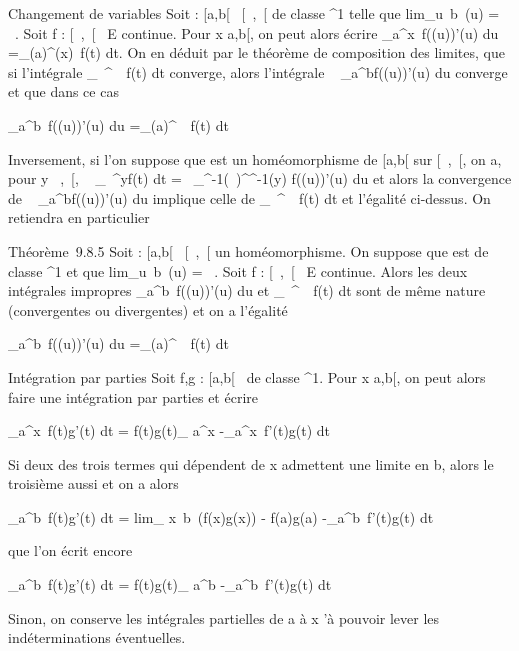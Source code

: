 \documentclass[]{article}
\begin{document}
Changement de variables Soit \phi : {[}a,b{[}\rightarrow~ {[}\alpha~,\beta~{[} de classe
^1 telle que lim\_u\rightarrow~b~\phi(u)
= \beta~. Soit f : {[}\alpha~,\beta~{[}\rightarrow~ E continue. Pour x \in {[}a,b{[}, on peut alors
écrire \int  \_a^x~f(\phi(u))\phi'(u) du
=\int  \_\phi(a)^\phi(x)~f(t) dt. On en
déduit par le théorème de composition des limites, que si l'intégrale
\int  \_\alpha~^\beta~~f(t) dt converge, alors
l'intégrale \int ~
\_a^bf(\phi(u))\phi'(u) du converge et que dans ce cas

\int  \_a^b~f(\phi(u))\phi'(u) du
=\int  \_\phi(a)^\beta~~f(t) dt

Inversement, si l'on suppose que \phi est un homéomorphisme de {[}a,b{[}
sur {[}\alpha~,\beta~{[}, on a, pour y \in {[}\alpha~,\beta~{[}, \int ~
\_\alpha~^yf(t) dt =\int ~
\_\phi^-1(\alpha~)^\phi^-1(y) f(\phi(u))\phi'(u) du et
alors la convergence de \int ~
\_a^bf(\phi(u))\phi'(u) du implique celle de
\int  \_\alpha~^\beta~~f(t) dt et l'égalité
ci-dessus. On retiendra en particulier

Théorème~9.8.5 Soit \phi : {[}a,b{[}\rightarrow~ {[}\alpha~,\beta~{[} un homéomorphisme. On
suppose que \phi est de classe ^1 et que
lim\_u\rightarrow~b~\phi(u) = \beta~. Soit f : {[}\alpha~,\beta~{[}\rightarrow~
E continue. Alors les deux intégrales impropres
\int  \_a^b~f(\phi(u))\phi'(u) du et
\int  \_\alpha~^\beta~~f(t) dt sont de même
nature (convergentes ou divergentes) et on a l'égalité

\int  \_a^b~f(\phi(u))\phi'(u) du
=\int  \_\phi(a)^\beta~~f(t) dt

Intégration par parties Soit f,g : {[}a,b{[}\rightarrow~  de classe
^1. Pour x \in {[}a,b{[}, on peut alors faire une intégration
par parties et écrire

\int  \_a^x~f(t)g'(t) dt =
\left {[}f(t)g(t)\right {]}\_
a^x -\int  \_a^x~f'(t)g(t)
dt

Si deux des trois termes qui dépendent de x admettent une limite en b,
alors le troisième aussi et on a alors

\int  \_a^b~f(t)g'(t) dt
= lim\_ x\rightarrow~b~(f(x)g(x)) - f(a)g(a)
-\int  \_a^b~f'(t)g(t) dt

que l'on écrit encore

\int  \_a^b~f(t)g'(t) dt =
\left {[}f(t)g(t)\right {]}\_
a^b -\int  \_a^b~f'(t)g(t)
dt

Sinon, on conserve les intégrales partielles de a à x \jmathusqu'à pouvoir
lever les indéterminations éventuelles.
\end{document}
